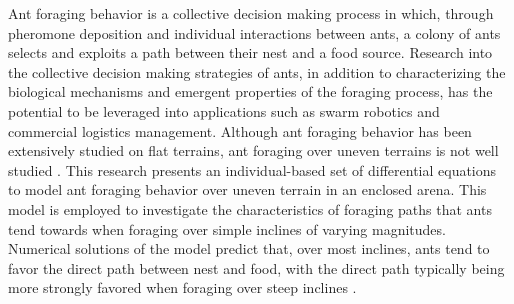 Ant foraging behavior is a collective decision making process in which, through  pheromone deposition and individual interactions between ants, a colony of ants selects and exploits a path between their nest and a food source.
Research into the collective decision making strategies of ants, in addition to characterizing the biological mechanisms and emergent properties of the foraging process, has the potential to be leveraged into applications such as swarm robotics and commercial logistics management.
Although ant foraging behavior has been extensively studied on flat terrains, ant foraging over uneven terrains is not well studied \cite{Clune2008HowDecreases}.
This research presents an individual-based set of differential equations to model ant foraging behavior over uneven terrain in an enclosed arena. This model is employed to investigate the characteristics of foraging paths that ants tend towards when foraging over simple inclines of varying magnitudes.
Numerical solutions of the model predict that, over most inclines, ants tend to favor the direct path between nest and food, with the direct path typically being more strongly favored when foraging over steep inclines \cite{Reisinger2007AcquiringRepresentations}.
